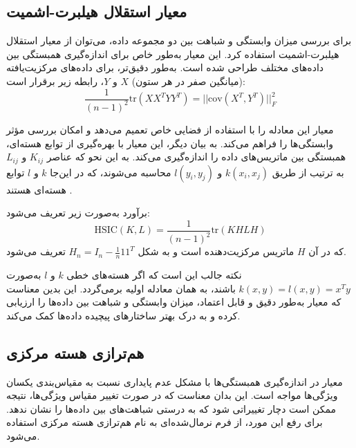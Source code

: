 \subsection{
	معیار استقلال هیلبرت-اشمیت%
	}
برای بررسی میزان وابستگی و شباهت بین دو مجموعه داده، می‌توان از معیار استقلال هیلبرت-اشمیت استفاده کرد. این معیار به‌طور خاص برای اندازه‌گیری همبستگی بین داده‌های مختلف طراحی شده است. به‌طور دقیق‌تر، برای داده‌های مرکزیت‌یافته (میانگین صفر در هر ستون) \(X\) و \(Y\)، رابطه زیر برقرار است:
\begin{equation}
	\frac{1}{(n - 1)^2} \text{tr}(XX^TYY^T) = ||\text{cov}(X^T, Y^T)||_F^2
\end{equation}

معیار
این معادله را با استفاده از فضایی خاص تعمیم می‌دهد و امکان بررسی مؤثر وابستگی‌ها را فراهم می‌کند. به بیان دیگر، این معیار با بهره‌گیری از توابع هسته‌ای، همبستگی بین ماتریس‌های داده را اندازه‌گیری می‌کند. به این نحو که عناصر \(K_{ij}\) و \(L_{ij}\) به ترتیب از طریق \(k(x_i, x_j)\) و \(l(y_i, y_j)\) محاسبه می‌شوند، که در این‌جا \(k\) و \(l\) توابع هسته‌ای هستند
\cite{gretton2005measuring}.

برآورد
به‌صورت زیر تعریف می‌شود:
\begin{equation}
	\text{HSIC}(K, L) = \frac{1}{(n - 1)^2} \text{tr}(KHLH)
	\label{eq_HSIC}
\end{equation}
که در آن
\(H\)
ماتریس مرکزیت‌دهنده است و به شکل \(H_n = I_n - \frac{1}{n} 11^T\) تعریف می‌شود.

نکته جالب این است که اگر هسته‌های خطی \(k\) و \(l\) به‌صورت \(k(x, y) = l(x, y) = x^Ty\) باشند،
به همان معادله اولیه برمی‌گردد. این بدین معناست که معیار 
به‌طور دقیق و قابل اعتماد، میزان وابستگی و شباهت بین داده‌ها را ارزیابی کرده و به درک بهتر ساختارهای پیچیده داده‌ها کمک می‌کند.


\subsection{
	هم‌ترازی هسته مرکزی%
}
معیار
در اندازه‌گیری همبستگی‌ها با مشکل عدم پایداری نسبت به مقیاس‌بندی یکسان ویژگی‌ها مواجه است. این بدان معناست که در صورت تغییر مقیاس ویژگی‌ها، نتیجه
ممکن است دچار تغییراتی شود که به درستی شباهت‌های بین داده‌ها را نشان ندهد. برای رفع این مورد، از فرم نرمال‌شده‌ای به نام هم‌ترازی هسته مرکزی استفاده می‌شود.

